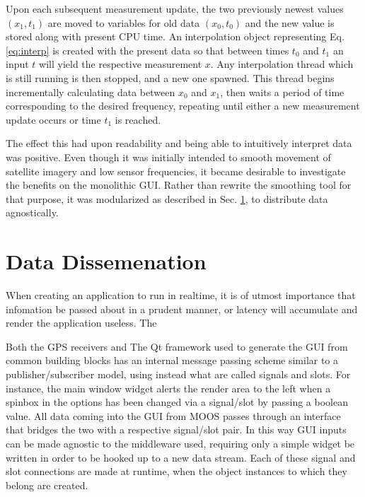 Upon each subsequent measurement update, the two previously newest values $(x_1,t_1)$ are moved to variables for old data $(x_0, t_0)$ and the new value is stored along with present CPU time. An interpolation object representing Eq. \eqref{eq:interp} is created with the present data so that between times $t_0$ and $t_1$ an input $t$ will yield the respective measurement $x$. Any interpolation thread which is still running is then stopped, and a new one spawned. This thread begins incrementally calculating data between $x_0$ and $x_1$, then waits a period of time corresponding to the desired frequency, repeating until either a new measurement update occurs or time $t_1$ is reached.

The effect this had upon readability and being able to intuitively interpret data was positive. Even though it was initially intended to smooth movement of satellite imagery and low sensor frequencies, it became desirable to investigate the benefits on the monolithic GUI. Rather than rewrite the smoothing tool for that purpose, it was modularized as described in Sec. \ref{sec:datadiss}, to distribute data agnostically.

\section{Data Dissemenation} \label{sec:datadiss}

When creating an application to run in realtime, it is of utmost importance that infomation be passed about in a prudent manner, or latency will accumulate and render the application useless. The 


Both the GPS receivers and 
The Qt \cite{qt} framework used to generate the GUI from common building blocks has an internal message passing scheme similar to a publisher/subscriber model, using instead what are called signals and slots. For instance, the main window widget alerts the render area to the left when a spinbox in the options has been changed via a signal/slot by passing a boolean value. All data coming into the GUI from MOOS passes through an interface that bridges the two with a respective signal/slot pair. In this way GUI inputs can be made agnostic to the middleware used, requiring only a simple widget be written in order to be hooked up to a new data stream. Each of these signal and slot connections are made at runtime, when the object instances to which they belong are created.

